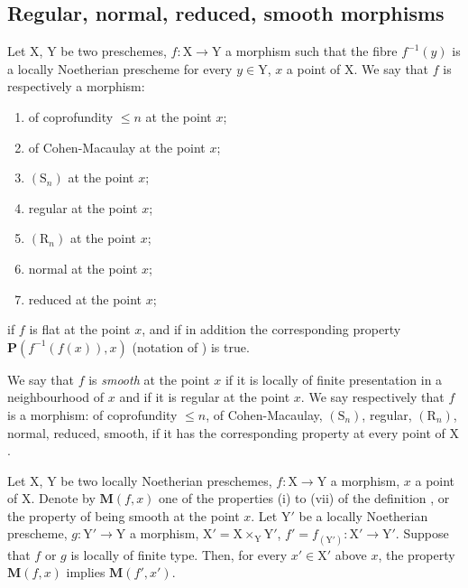 \subsection{Regular, normal, reduced, smooth morphisms}
\label{subsection:IV.6.8}

\begin{definition}[6.8.1]
\label{IV.6.8.1}
Let $\mathrm{X}$, $\mathrm{Y}$ be two preschemes, $f:\mathrm{X}\to\mathrm{Y}$ a morphism such that the fibre $f^{-1}(y)$ is a locally Noetherian prescheme for every $y\in\mathrm{Y}$, $x$ a point of $\mathrm{X}$. We say that $f$ is respectively a morphism:
\begin{enumerate}[label=\textup{(\roman*)}]
  \item of coprofundity $\leqslant n$ at the point $x$;
  \item of Cohen-Macaulay at the point $x$;
  \item $(\mathrm{S}_n)$ at the point $x$;
  \item regular at the point $x$;
  \item $(\mathrm{R}_n)$ at the point $x$;
  \item normal at the point $x$;
  \item reduced at the point $x$;
\end{enumerate}
if $f$ is flat at the point $x$, and if in addition the corresponding property $\boldsymbol{P}(f^{-1}(f(x)),x)$ \textnormal{(}notation of \textnormal{)} is true.

We say that $f$ is \emph{smooth} at the point $x$ if it is locally of finite presentation in a neighbourhood of $x$ and if it is regular at the point $x$. We say respectively that $f$ is a morphism: of coprofundity $\leqslant n$, of Cohen-Macaulay, $(\mathrm{S}_n)$, regular, $(\mathrm{R}_n)$, normal, reduced, smooth, if it has the corresponding property at every point of $\mathrm{X}$.
\end{definition}

\begin{proposition}[6.8.2]
\label{IV.6.8.2}
Let $\mathrm{X}$, $\mathrm{Y}$ be two locally Noetherian preschemes, $f:\mathrm{X}\to\mathrm{Y}$ a morphism, $x$ a point of $\mathrm{X}$. Denote by $\boldsymbol{M}(f,x)$ one of the properties \textup{(i)} to \textup{(vii)} of the definition , or the property of being smooth at the point $x$. Let $\mathrm{Y}'$ be a locally Noetherian prescheme, $g:\mathrm{Y}'\to\mathrm{Y}$ a morphism, $\mathrm{X}'=\mathrm{X}\times_\mathrm{Y}\mathrm{Y}'$, $f'=f_{(\mathrm{Y}')}:\mathrm{X}'\to\mathrm{Y}'$. Suppose that $f$ or $g$ is locally of finite type. Then, for every $x'\in\mathrm{X}'$ above $x$, the property $\boldsymbol{M}(f,x)$ implies $\boldsymbol{M}(f',x')$.
\end{proposition}

